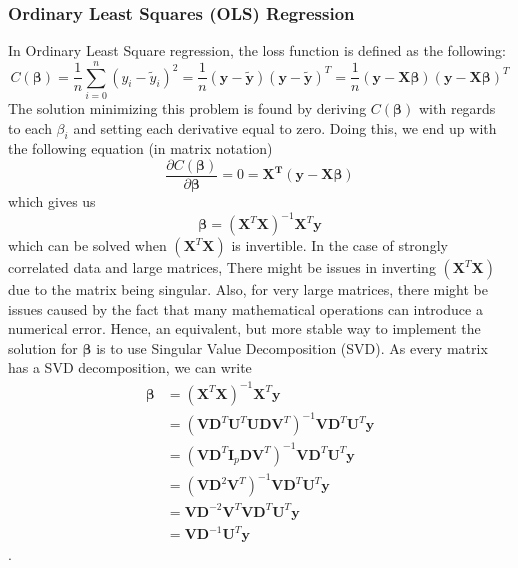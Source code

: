 \documentclass[11pt,a4paper,titlepage]{article}
\begin{document}
\subsubsection{Ordinary Least Squares (OLS) Regression}
In Ordinary Least Square regression, the loss function is defined as the following:
\begin{equation*}
C(\bm{\beta})= \frac{1}{n}\sum_{i=0}^n\left( y_i-\tilde y_i \right)^2
=\frac{1}{n}(\bm{y}-\bm{\tilde y})(\bm{y}-\bm{\tilde y})^T=
\frac{1}{n}(\bm{y}-\bm{X\beta})(\bm{y}-\bm{X\beta})^T
\end{equation*}
The solution minimizing this problem is found by deriving $C(\bm{\beta})$ with regards to each $\beta_i$ and setting each derivative equal to zero. Doing this, we end up with the following equation (in matrix notation)
\begin{equation*}
\frac{\partial C(\bm{\beta})}{\partial\bm{\beta}}=0=\bm{X^T}(\bm{y}-\bm{X\beta})
\end{equation*}
which gives us
\begin{equation*}
\bm{\beta}=(\bm{X}^T\bm{X})^{-1}\bm{X}^T\bm{y}
\end{equation*}
which can be solved when $(\bm{X}^T\bm{X})$ is invertible. In the case of strongly correlated data and large matrices, There might be issues in inverting $(\bm{X}^T\bm{X})$ due to the matrix being singular. Also, for very large matrices, there might be issues caused by the fact that many mathematical operations can introduce a numerical error. Hence, an equivalent, but more stable way to implement the solution for $\bm{\beta}$ is to use Singular Value Decomposition (SVD). As every matrix has a SVD decomposition, we can write
\begin{equation}\label{SVD_OLS}
\begin{split}\bm{\beta} & =\left(\bm{X}^T\bm{X}\right)^{-1}\bm{X}^T\bm{y}\\
& = \left(\bm{V}\bm{D}^T\bm{U}^T\bm{U}\bm{D}\bm{V}^T\right)^{-1}\bm{V}\bm{D}^T\bm{U}^T\bm{y}\\
& = \left(\bm{V}\bm{D}^T\bm{I}_p\bm{D}\bm{V}^T\right)^{-1}\bm{V}\bm{D}^T\bm{U}^T\bm{y}\\
& = \left(\bm{V}\bm{D}^2\bm{V}^T\right)^{-1}\bm{V}\bm{D}^T\bm{U}^T\bm{y}\\
& = \bm{V}\bm{D}^{-2}\bm{V}^T\bm{V}\bm{D}^T\bm{U}^T\bm{y}\\
& = \bm{V}\bm{D}^{-1}\bm{U}^T\bm{y}\end{split}
\end{equation}.
\end{document}
